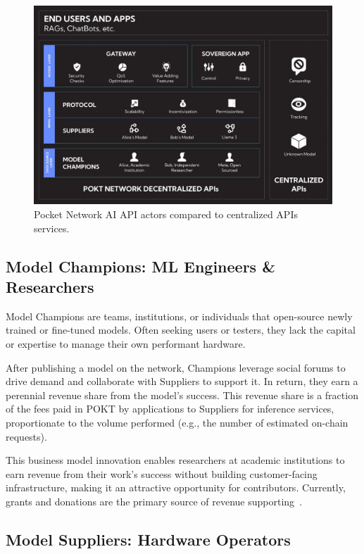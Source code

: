 \documentclass[conference,compsoc]{IEEEtran}
\begin{document}
\begin{figure}[!h]
\centering
\includegraphics[width=0.9\linewidth]{stakeholders.jpeg}
\caption{Pocket Network AI API actors compared to centralized APIs services.}
\label{fig_sim}
\end{figure}

\subsection{Model Champions: ML Engineers \& Researchers}
Model Champions are teams, institutions, or individuals that open-source newly trained or fine-tuned models. Often seeking users or testers, they lack the capital or expertise to manage their own performant hardware.

After publishing a model on the network, Champions leverage social forums to drive demand and collaborate with Suppliers to support it. In return, they earn a perennial revenue share from the model's success. This revenue share is a fraction of the fees paid in POKT by applications to Suppliers for inference services, proportionate to the volume performed (e.g., the number of estimated on-chain requests).

This business model innovation enables researchers at academic institutions to earn revenue from their work's success without building customer-facing infrastructure, making it an attractive opportunity for contributors. Currently, grants and donations are the primary source of revenue supporting~\cite{lmsysDonationsLMSYS}.

\subsection{Model Suppliers: Hardware Operators}
\end{document}
